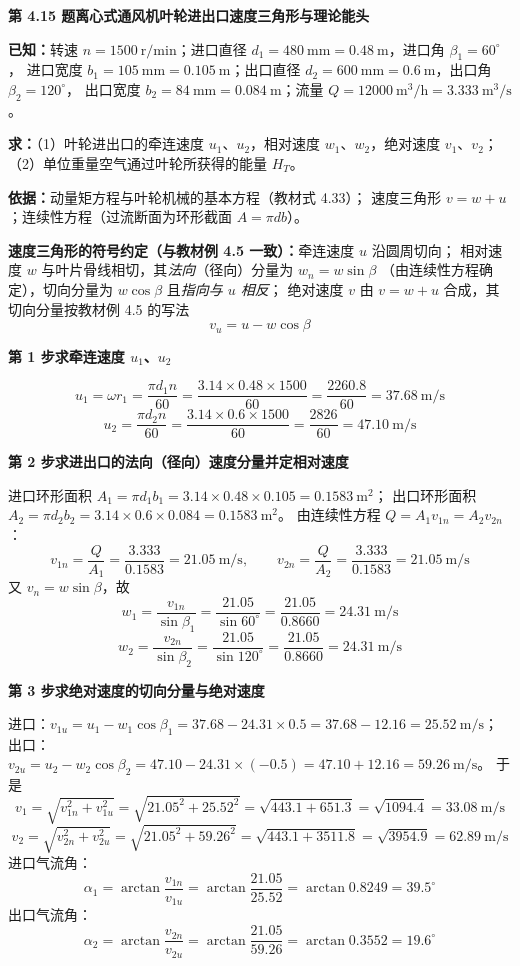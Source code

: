 \noindent\textbf{第 4.15 题\quad 离心式通风机叶轮进出口速度三角形与理论能头}

\begin{jie}
\textbf{已知：}转速 $n=1500\ \mathrm{r/min}$；进口直径 $d_1=480\ \mathrm{mm}=0.48\ \mathrm{m}$，进口角 $\beta_1=60^\circ$，
进口宽度 $b_1=105\ \mathrm{mm}=0.105\ \mathrm{m}$；出口直径 $d_2=600\ \mathrm{mm}=0.6\ \mathrm{m}$，出口角 $\beta_2=120^\circ$，
出口宽度 $b_2=84\ \mathrm{mm}=0.084\ \mathrm{m}$；流量 $Q=12000\ \mathrm{m^3/h}=3.333\ \mathrm{m^3/s}$。

\textbf{求：}（1）叶轮进出口的牵连速度 $u_1$、$u_2$，相对速度 $w_1$、$w_2$，绝对速度 $v_1$、$v_2$；
（2）单位重量空气通过叶轮所获得的能量 $H_T$。

\textbf{依据：}动量矩方程与叶轮机械的基本方程（教材式 4.33）；
速度三角形 $v=w+u$；连续性方程（过流断面为环形截面 $A=\pi db$）。

\textbf{速度三角形的符号约定（与教材例 4.5 一致）：}牵连速度 $u$ 沿圆周切向；
相对速度 $w$ 与叶片骨线相切，其\emph{法向}（径向）分量为 $w_n=w\sin\beta$
（由连续性方程确定），切向分量为 $w\cos\beta$ 且\emph{指向与 $u$ 相反}；
绝对速度 $v$ 由 $v=w+u$ 合成，其切向分量按教材例 4.5 的写法
\[ v_u=u-w\cos\beta \]

\textbf{第 1 步\quad 求牵连速度 $u_1$、$u_2$}

\[ u_1=\omega r_1=\frac{\pi d_1n}{60}=\frac{3.14\times0.48\times1500}{60}
   =\frac{2260.8}{60}=37.68\ \mathrm{m/s} \]
\[ u_2=\frac{\pi d_2n}{60}=\frac{3.14\times0.6\times1500}{60}
   =\frac{2826}{60}=47.10\ \mathrm{m/s} \]

\textbf{第 2 步\quad 求进出口的法向（径向）速度分量并定相对速度}

进口环形面积 $A_1=\pi d_1b_1=3.14\times0.48\times0.105=0.1583\ \mathrm{m^2}$；
出口环形面积 $A_2=\pi d_2b_2=3.14\times0.6\times0.084=0.1583\ \mathrm{m^2}$。
由连续性方程 $Q=A_1v_{1n}=A_2v_{2n}$：
\[ v_{1n}=\frac{Q}{A_1}=\frac{3.333}{0.1583}=21.05\ \mathrm{m/s},\qquad
   v_{2n}=\frac{Q}{A_2}=\frac{3.333}{0.1583}=21.05\ \mathrm{m/s} \]
又 $v_n=w\sin\beta$，故
\[ w_1=\frac{v_{1n}}{\sin\beta_1}=\frac{21.05}{\sin60^\circ}=\frac{21.05}{0.8660}=24.31\ \mathrm{m/s} \]
\[ w_2=\frac{v_{2n}}{\sin\beta_2}=\frac{21.05}{\sin120^\circ}=\frac{21.05}{0.8660}=24.31\ \mathrm{m/s} \]

\textbf{第 3 步\quad 求绝对速度的切向分量与绝对速度}

进口：$v_{1u}=u_1-w_1\cos\beta_1=37.68-24.31\times0.5=37.68-12.16=25.52\ \mathrm{m/s}$；
出口：$v_{2u}=u_2-w_2\cos\beta_2=47.10-24.31\times(-0.5)=47.10+12.16=59.26\ \mathrm{m/s}$。
于是
\[ v_1=\sqrt{v_{1n}^2+v_{1u}^2}=\sqrt{21.05^2+25.52^2}=\sqrt{443.1+651.3}=\sqrt{1094.4}=33.08\ \mathrm{m/s} \]
\[ v_2=\sqrt{v_{2n}^2+v_{2u}^2}=\sqrt{21.05^2+59.26^2}=\sqrt{443.1+3511.8}=\sqrt{3954.9}=62.89\ \mathrm{m/s} \]
进口气流角：
\[ \alpha_1=\arctan\frac{v_{1n}}{v_{1u}}=\arctan\frac{21.05}{25.52}=\arctan0.8249=39.5^\circ \]
出口气流角：
\[ \alpha_2=\arctan\frac{v_{2n}}{v_{2u}}=\arctan\frac{21.05}{59.26}=\arctan0.3552=19.6^\circ \]


\end{jie}
